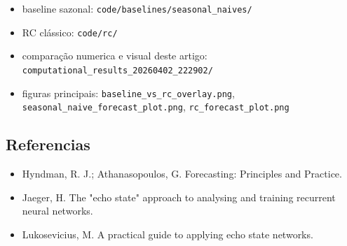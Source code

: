 \documentclass[12pt]{article}
\providecommand{\tightlist}{%
          \setlength{\itemsep}{0pt}\setlength{\parskip}{0pt}}
\begin{document}
\begin{itemize}
\tightlist
\item
  baseline sazonal: \texttt{code/baselines/seasonal\_naives/}
\item
  RC clássico: \texttt{code/rc/}
\item
  comparação numerica e visual deste artigo: \texttt{computational\_results\_20260402\_222902/}
\item
  figuras principais: \texttt{baseline\_vs\_rc\_overlay.png}, \texttt{seasonal\_naive\_forecast\_plot.png}, \texttt{rc\_forecast\_plot.png}
\end{itemize}

\subsection{Referencias}\label{referencias}

\begin{itemize}
\tightlist
\item
  Hyndman, R. J.; Athanasopoulos, G. Forecasting: Principles and Practice.
\item
  Jaeger, H. The "echo state" approach to analysing and training recurrent neural networks.
\item
  Lukosevicius, M. A practical guide to applying echo state networks.
\end{itemize}

        
\end{document}

